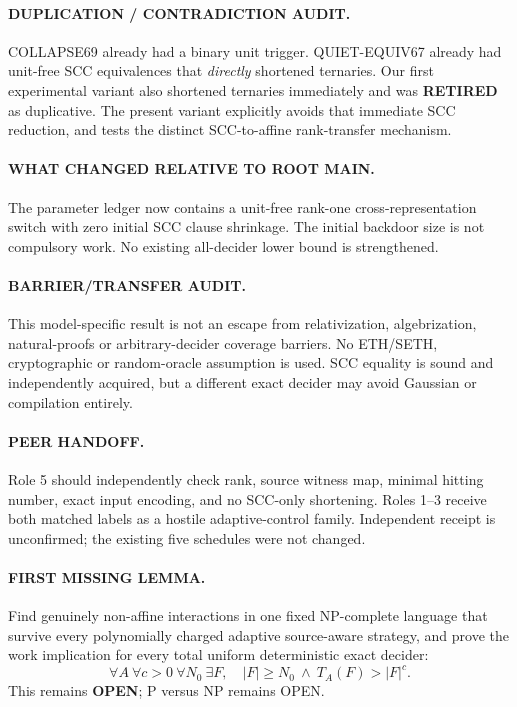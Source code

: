 \documentclass[11pt]{article}
\begin{document}
\paragraph{DUPLICATION / CONTRADICTION AUDIT.}
COLLAPSE69 already had a binary unit trigger. QUIET-EQUIV67 already had
unit-free SCC equivalences that \emph{directly} shortened ternaries.
Our first experimental variant also shortened ternaries immediately
and was \textbf{RETIRED} as duplicative. The present variant explicitly
avoids that immediate SCC reduction, and tests the distinct
SCC-to-affine rank-transfer mechanism.
\paragraph{WHAT CHANGED RELATIVE TO ROOT MAIN.}
The parameter ledger now contains a unit-free rank-one
cross-representation switch with zero initial SCC clause shrinkage.
The initial backdoor size is not compulsory work. No existing
all-decider lower bound is strengthened.
\paragraph{BARRIER/TRANSFER AUDIT.}
This model-specific result is not an escape from relativization,
algebrization, natural-proofs or arbitrary-decider coverage barriers.
No ETH/SETH, cryptographic or random-oracle assumption is used.
SCC equality is sound and independently acquired, but a different
exact decider may avoid Gaussian or compilation entirely.
\paragraph{PEER HANDOFF.}
Role 5 should independently check rank, source witness map,
minimal hitting number, exact input encoding, and no SCC-only
shortening. Roles 1--3 receive both matched labels as a hostile
adaptive-control family. Independent receipt is unconfirmed;
the existing five schedules were not changed.
\paragraph{FIRST MISSING LEMMA.}
Find genuinely non-affine interactions in one fixed NP-complete
language that survive every polynomially charged adaptive
source-aware strategy, and prove the work implication for every
total uniform deterministic exact decider:
\[
\forall A\ \forall c>0\ \forall N_0\ \exists F,\quad
|F|\ge N_0\ \wedge\ T_A(F)>|F|^c.
\]
This remains \textbf{OPEN}; P versus NP remains OPEN.
\end{document}
